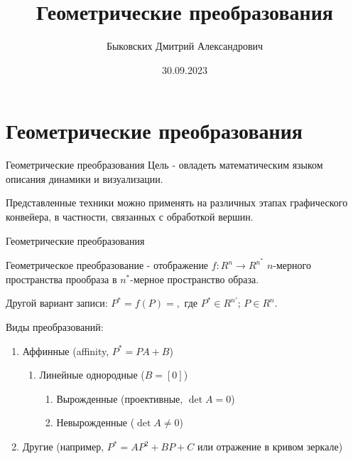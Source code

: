 \documentclass{beamer}
\title[Геометрические преобразования]{Геометрические преобразования}
\author[Быковских Д.А.]{Быковских Дмитрий Александрович}
\date{30.09.2023}
\begin{document}
	\begin{frame}
		\titlepage
	\end{frame}

	\section{Геометрические преобразования}

	\begin{frame}{Геометрические преобразования}
		Цель - овладеть математическим языком описания динамики и визуализации.

		Представленные техники можно применять на различных этапах графического конвейера, в частности, связанных с обработкой вершин.
	\end{frame}

	\begin{frame}{Геометрические преобразования}
				
		Геометрическое преобразование - отображение $f:R^n \to R^{n^{*}}$ $n$-мерного пространства прообраза в $n^{*}$-мерное пространство образа.

		Другой вариант записи:	
		$
			P^{*}=f(P)=
			,
		$
		где 
		$P^{*} \in R^{n'}$;
		$P \in R^n $.
		
		Виды преобразований:
		\begin{enumerate}
			\item Аффинные (affinity, $P^{*} = P  A+B$)
				\begin{enumerate}
					\item Линейные однородные ($B = [0]$)
					\begin{enumerate}
						\item Вырожденные (проективные, $\det{A} = 0$)
						\item Невырожденные ($\det{A}\neq 0$)
					\end{enumerate}
				\end{enumerate}
			\item Другие (например, $P^{*}=A P^2+B P+ C$ или отражение в кривом зеркале)
		\end{enumerate}

\end{frame}
\end{document}
